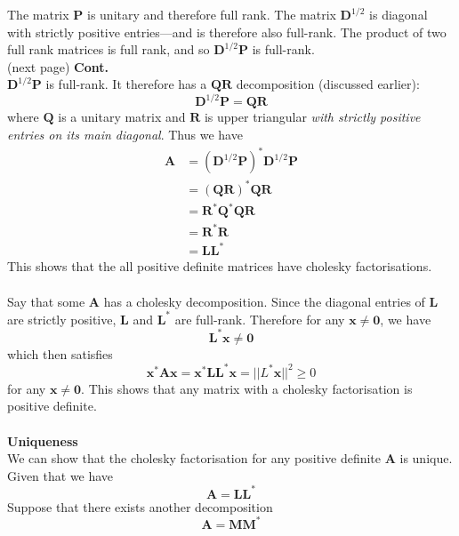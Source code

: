 \documentclass{report}
\begin{document}
The matrix $\bm P$ is unitary and therefore full rank. The matrix $\bm D^{1/2}$ is diagonal with strictly positive entries---and is therefore also
full-rank. The product of two full rank matrices is full rank, and so 
$\bm D^{1/2}\bm P$ is full-rank.\\
(next page)\newpage
\noindent\textbf{Cont.}\\
$\bm D^{1/2}\bm P$ is full-rank. It therefore has a $\bm{QR}$ decomposition (discussed earlier):
\begin{equation*}
\bm D^{1/2}\bm P=\bm{QR}
\end{equation*}
where $\bm Q$ is a unitary matrix and $\bm R$ is upper triangular \textit{with strictly positive entries on its main diagonal}. Thus we have
\begin{align*}
\bm A&=(\bm D^{1/2}\bm P)^*\bm D^{1/2}\bm P\\
&=(\bm{QR})^*\bm{QR}\\
&=\bm R^*\bm Q^*\bm{QR}\\
&=\bm R^*\bm R\\
&=\bm{LL}^*
\end{align*}
This shows that the all positive definite matrices have cholesky factorisations.\\
\vspace{1mm}\\
Say that some $\bm A$ has a cholesky decomposition. Since the diagonal entries of $\bm L$ are strictly positive, $\bm L$ and $\bm L^*$ are
full-rank. Therefore for any $\bm x\neq\bm 0$, we have
\begin{equation*}
\bm L^*\bm x\neq\bm0
\end{equation*}
which then satisfies
\begin{equation*}
\bm x^*\bm A\bm x=\bm x^*\bm L\bm L^*\bm x=||L^*\bm x||^2\geq0
\end{equation*}
for any $\bm x\neq\bm0$. This shows that any matrix with a cholesky factorisation is positive definite.\\
\vspace{1mm}\\
\textbf{Uniqueness}\\
We can show that the cholesky factorisation for any positive definite $\bm A$ is unique. Given that we have
\begin{equation*}
\bm A=\bm{LL}^*
\end{equation*}
Suppose that there exists another decomposition
\begin{equation*}
\bm{A}=\bm{MM}^*
\end{equation*}
\end{document}
